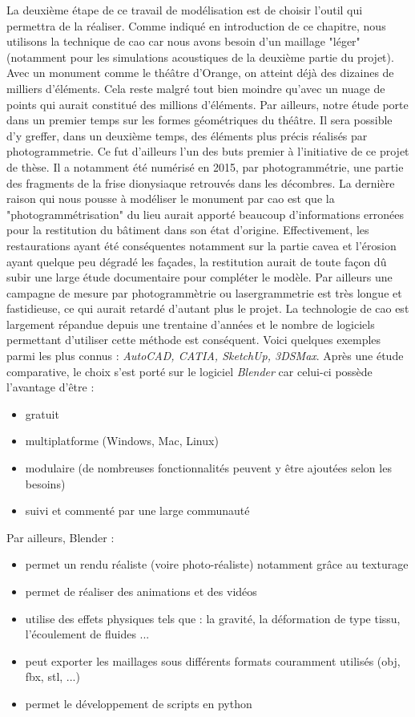 La deuxième étape de ce travail de modélisation est de choisir l'outil qui permettra de la réaliser. Comme indiqué en introduction de ce chapitre, nous utilisons la technique de \gls{cao} car nous avons besoin d'un maillage "léger" (notamment pour les simulations acoustiques de la deuxième partie du projet). Avec un monument comme le théâtre d'Orange, on atteint déjà des dizaines de milliers d'éléments. Cela reste malgré tout bien moindre qu'avec un nuage de points qui aurait constitué des millions d'éléments. Par ailleurs, notre étude porte dans un premier temps sur les formes géométriques du théâtre. Il sera possible d'y greffer, dans un deuxième temps, des éléments plus précis réalisés par photogrammetrie. Ce fut d'ailleurs l'un des buts premier à l'initiative de ce projet de thèse. Il a notamment été numérisé en 2015, par photogrammétrie, une partie des fragments de la frise dionysiaque retrouvés dans les décombres. La dernière raison qui nous pousse à modéliser le monument par \gls{cao} est que la "photogrammétrisation" du lieu aurait apporté beaucoup d'informations erronées pour la restitution du bâtiment dans son état d'origine. Effectivement, les restaurations ayant été conséquentes notamment sur la partie  \gls{cavea} et l'érosion ayant quelque peu dégradé les façades, la restitution aurait de toute façon dû subir une large étude documentaire pour compléter le modèle. Par ailleurs une campagne de mesure par photogrammètrie ou lasergrammetrie est très longue et fastidieuse, ce qui aurait retardé d'autant plus le projet. La technologie de \gls{cao} est largement répandue depuis une trentaine d'années et le nombre de logiciels permettant d'utiliser cette méthode est conséquent. Voici quelques exemples parmi les plus connus : \textit{AutoCAD, CATIA, SketchUp, 3DSMax}. Après une étude comparative, le choix s'est porté sur le logiciel \textit{Blender} car celui-ci possède l'avantage d'être :

\begin{itemize}
	\item gratuit
	\item multiplatforme (Windows, Mac, Linux)
	\item modulaire (de nombreuses fonctionnalités peuvent y être ajoutées selon les besoins)
	\item suivi et commenté par une large communauté
\end{itemize}

Par ailleurs, Blender : 
\begin{itemize}
	\item permet un rendu réaliste (voire photo-réaliste) notamment grâce au texturage
	\item permet de réaliser des animations et des vidéos
	\item utilise des effets physiques tels que : la gravité, la déformation de type tissu, l'écoulement de fluides ...
	\item peut exporter les maillages sous différents formats couramment utilisés (obj, fbx, stl, ...)
	\item permet le développement de scripts en python
\end{itemize}

